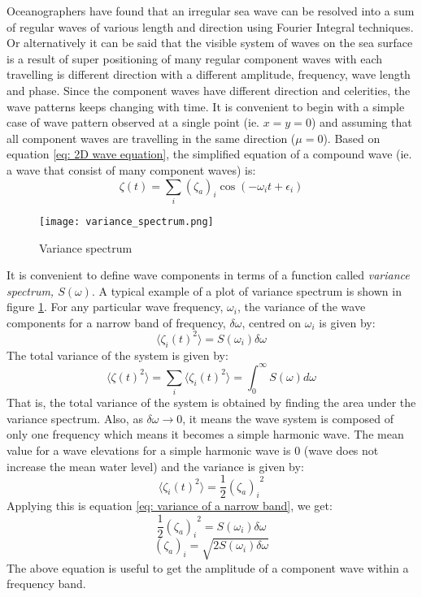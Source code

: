 Oceanographers have found that an irregular sea wave can be resolved into a sum
of regular waves of various length and direction using Fourier Integral
techniques. Or alternatively it can be said that the visible system of waves on
the sea surface is a result of super positioning of many regular component waves
with each travelling is different direction with a different amplitude,
frequency, wave length and phase. Since the component waves have different
direction and celerities, the wave patterns keeps changing with time.  It is
convenient to begin with a simple case of wave pattern observed at a single
point (ie. $x = y = 0$) and assuming that all component waves are travelling in
the same direction ($\mu = 0$). Based on equation 
\ref{eq: 2D wave equation}, the simplified equation of a compound wave (ie. a 
wave that consist of many component waves) is:
\begin{equation}
  \zeta(t) = \sum _{i} (\zeta_a)_i \cos(-\omega_i t + \epsilon_i)
  \label{eq: 2D irregular wave equation}
\end{equation}

\begin{figure}
  \centering
  \texttt{[image: variance\_spectrum.png]}
  \caption{Variance spectrum}
  \label{fig: variance spectrum}
\end{figure}

It is convenient to define wave components in terms of a function called 
\textit{variance spectrum, $S(\omega)$}. A typical example of a plot of variance
spectrum is shown in figure \ref{fig: variance spectrum}. For any particular 
wave frequency, $\omega_i$, the variance of the wave components for a narrow 
band of frequency, $\delta \omega$, centred on $\omega_i$ is given by:
\begin{equation}
  \langle \zeta_i (t)^2 \rangle = S(\omega_i) \delta \omega
  \label{eq: variance of a narrow band}
\end{equation}
The total variance of the system is given by:
\begin{equation}
  \langle \zeta (t)^2 \rangle = \sum _{i} \langle \zeta_i (t)^2 \rangle = 
  \int _{0}^{\infty} S(\omega) d\omega
\end{equation}
That is, the total variance of the system is obtained by finding the area under
the variance spectrum. Also, as $\delta \omega \to 0$, it means the wave system
is composed of only one frequency which means it becomes a simple harmonic wave. 
The mean value for a wave elevations for a simple harmonic wave is $0$ (wave 
does not increase the mean water level) and the variance is given by:
\begin{equation}
  \langle \zeta_i (t)^2 \rangle = \frac{1}{2} {(\zeta_a)_i }^2
\end{equation}
Applying this is equation \ref{eq: variance of a narrow band}, we get:
\begin{equation}
  \frac{1}{2} {(\zeta_a)_i}^2 = S(\omega_i) \delta \omega
\end{equation}
\begin{equation}
  (\zeta_a)_i = \sqrt{2 S(\omega_i) \delta \omega}
\end{equation}
The above equation is useful to get the amplitude of a component wave within a
frequency band. 

